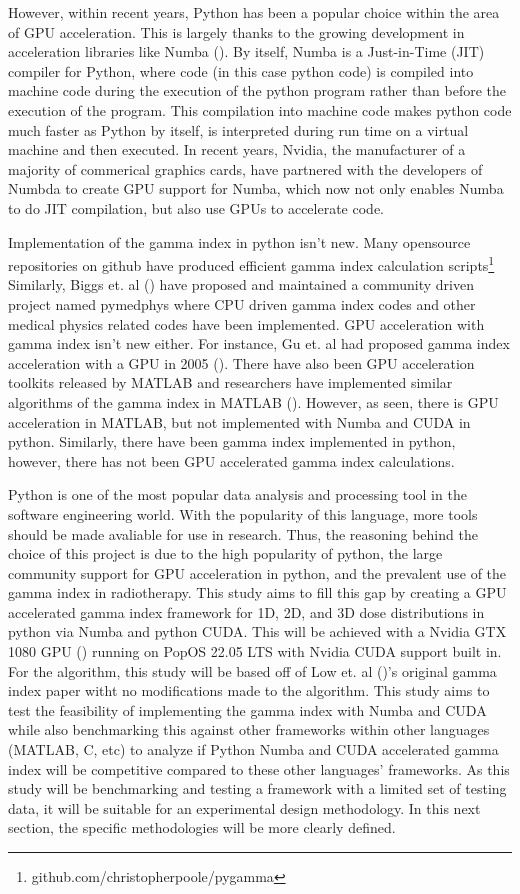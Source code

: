\documentclass[12pt]{article}
\begin{document}
However, within recent years, Python has been a popular choice within the area of GPU acceleration. This is largely thanks to the growing development in acceleration libraries like Numba (\textcite{Lam}). By itself, Numba is a Just-in-Time (JIT) compiler for Python, where code (in this case python code) is compiled into machine code during the execution of the python program rather than before the execution of the program. This compilation into machine code makes python code much faster as Python by itself, is interpreted during run time on a virtual machine and then executed. In recent years, Nvidia, the manufacturer of a majority of commerical graphics cards, have partnered with the developers of Numbda to create GPU support for Numba, which now not only enables Numba to do JIT compilation, but also use GPUs to accelerate code.

Implementation of the gamma index in python isn’t new. Many opensource repositories on github have produced efficient gamma index calculation scripts\footnote[1]{github.com/christopherpoole/pygamma} Similarly, Biggs et. al (\textcite{Biggs}) have proposed and maintained a community driven project named pymedphys where CPU driven gamma index codes and other medical physics related codes have been implemented. GPU acceleration with gamma index isn’t new either. For instance, Gu et. al had proposed gamma index acceleration with a GPU in 2005 (\textcite{Gu}). There have also been GPU acceleration toolkits released by MATLAB and researchers have implemented similar algorithms of the gamma index in MATLAB (\textcite{Matlab}). However, as seen, there is GPU acceleration in MATLAB, but not implemented with Numba and CUDA in python. Similarly, there have been gamma index implemented in python, however, there has not been GPU accelerated gamma index calculations.

Python is one of the most popular data analysis and processing tool in the software engineering world. With the popularity of this language, more tools should be made avaliable for use in research. Thus, the reasoning behind the choice of this project is due to the high popularity of python, the large community support for GPU acceleration in python, and the prevalent use of the gamma index in radiotherapy. This study aims to fill this gap by creating a GPU accelerated gamma index framework for 1D, 2D, and 3D dose distributions in python via Numba and python CUDA. This will be achieved with a Nvidia GTX 1080 GPU (\textcite{NVidia}) running on PopOS 22.05 LTS with Nvidia CUDA support built in. For the algorithm, this study will be based off of Low et. al (\textcite{Low})’s original gamma index paper witht no modifications made to the algorithm. This study aims to test the feasibility of implementing the gamma index with Numba and CUDA while also benchmarking this against other frameworks within other languages (MATLAB, C, etc) to analyze if Python Numba and CUDA accelerated gamma index will be competitive compared to these other languages’ frameworks. As this study will be benchmarking and testing a framework with a limited set of testing data, it will be suitable for an experimental design methodology. In this next section, the specific methodologies will be more clearly defined.
\pagebreak

\printbibliography
\end{document}
